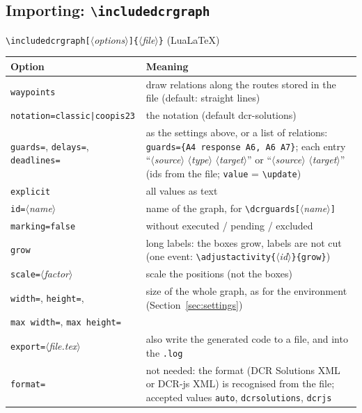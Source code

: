 \documentclass[a4paper,11pt]{article}
\newcommand\cs[1]{\texttt{\textbackslash#1}}
\newcommand\key[1]{\texttt{#1}}
\newcommand\meta[1]{\ensuremath{\langle}\textit{#1}\ensuremath{\rangle}}
\newcommand\marg[1]{\texttt{\{}\meta{#1}\texttt{\}}}
\newcommand\oarg[1]{\texttt{[}\meta{#1}\texttt{]}}
\begin{document}
\subsection{Importing: \texorpdfstring{\cs{includedcrgraph}}{includedcrgraph}}\label{sec:include}
\cs{includedcrgraph}\oarg{options}\marg{file} \quad (Lua\LaTeX)

\medskip
\begin{tabularx}{\linewidth}{@{}lL@{}}
\toprule
Option & Meaning\\
\midrule
\key{waypoints} & draw relations along the routes stored in the file
  (default: straight lines)\\
\key{notation=classic|coopis23} & the notation (default dcr-solutions)\\
\key{guards=}, \key{delays=}, \key{deadlines=} & as the settings above, or a list of
  relations: \key{guards=\{A4 response A6, A6 A7\}}; each entry
  ``\meta{source} \meta{type} \meta{target}'' or ``\meta{source} \meta{target}''
  (ids from the file; \key{value} = \cs{update})\\
\key{explicit} & all values as text\\
\key{id=}\meta{name} & name of the graph, for \cs{dcrguards}\oarg{name}\\
\key{marking=false} & without executed / pending / excluded\\
\key{grow} & long labels: the boxes grow, labels are not cut (one event:
  \cs{adjustactivity}\marg{id}\texttt{\{grow\}})\\
\key{scale=}\meta{factor} & scale the positions (not the boxes)\\
\key{width=}, \key{height=}, & size of the whole graph, as for the
  environment (Section~\ref{sec:settings})\\
\key{max width=}, \key{max height=} & \\
\key{export=}\meta{file.tex} & also write the generated code to a file, and
  into the \texttt{.log}\\
\key{format=} & not needed: the format (DCR Solutions XML or DCR-js XML) is
  recognised from the file; accepted values \key{auto}, \key{dcrsolutions},
  \key{dcrjs}\\
\bottomrule
\end{tabularx}
\end{document}
